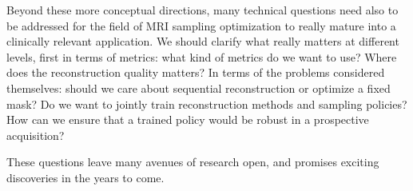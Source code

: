 Beyond these more conceptual directions, many technical questions need also to be addressed for the field of MRI sampling optimization to really mature into a clinically relevant application. We should clarify what really matters at different levels, first in terms of metrics: what kind of metrics do we want to use? Where does the reconstruction quality matters? In terms of the problems considered themselves: should we care about sequential reconstruction or optimize a fixed mask? Do we want to jointly train reconstruction methods and sampling policies? How can we ensure that a trained policy would be robust in a prospective acquisition?

These questions leave many avenues of research open, and promises exciting discoveries in the years to come.


 
